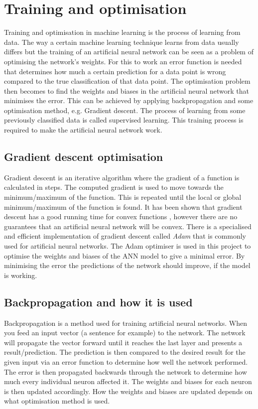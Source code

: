 \section{Training and optimisation} \label{sec:trainingoptimisation}
Training and optimisation in machine learning is the process of learning from data. The way a certain machine learning technique learns from data usually differs but the training of an artificial neural network can be seen as a problem of optimising the network's weights. For this to work an error function is needed that determines how much a certain prediction for a data point is wrong compared to the true classification of that data point. The optimisation problem then becomes to find the weights and biases in the artificial neural network that minimises the error. This can be achieved by applying backpropagation and some optimisation method, e.g. Gradient descent. The process of learning from some previously classified data is called supervised learning. This training process is required to make the artificial neural network work.

\subsection{Gradient descent optimisation}\label{sec:gradient_descent}
Gradient descent is an iterative algorithm where the gradient of a function is calculated in steps. The computed gradient is used to move towards the minimum/maximum of the function. This is repeated until the local or global minimum/maximum of the function is found. It has been shown that gradient descent has a good running time for convex functions \parencite{convexSGD}, however there are no guarantees that an artificial neural network will be convex. There is a specialised and efficient implementation of gradient descent called \textit{Adam} \parencite{adamoptimizer} that is commonly used for artificial neural networks. The Adam optimiser is used in this project to optimise the weights and biases of the ANN model to give a minimal error. By minimising the error the predictions of the network should improve, if the model is working.

\subsection{Backpropagation and how it is used}\label{sec:backpropagation}
Backpropagation is a method used for training artificial neural networks. When you feed an input vector (a sentence for example) to the network. The network will propagate the vector forward until it reaches the last layer and presents a result/prediction. The prediction is then compared to the desired result for the given input via an error function to determine how well the network performed. The error is then propagated backwards through the network to determine how much every individual neuron affected it. The weights and biases for each neuron is then updated accordingly. How the weights and biases are updated depends on what optimisation method is used.


